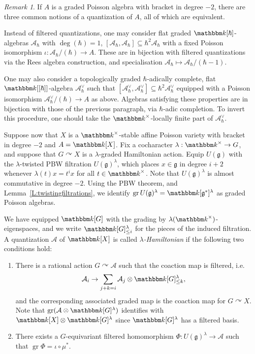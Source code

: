 \documentclass[twoside,12pt,reqno]{amsart}
\theoremstyle{remark}
\newtheorem{Remark}[Theorem]{Remark}
\numberwithin{equation}{section}
\def\k{{\mathbbm k}}
\def\gr{\operatorname{gr}}
\def\g{{\mathfrak g}}
\newcommand{\A}{\mathcal{A}}
\begin{document}
\begin{Remark}
\label{R:differentquantizations}
If $A$ is a graded Poisson algebra with bracket in degree $-2$, there are three common notions of a quantization of $A$, all of which are equivalent.

Instead of filtered quantizations, one may consider flat graded $\k[\hbar]$-algebras $\A_\hbar$ with $\deg(\hbar) = 1$, $[\A_\hbar, \A_\hbar] \subseteq \hbar^2 \A_\hbar$ with a fixed Poisson isomorphism $\iota : \A_\hbar / (\hbar) \to A$. These are in bijection with filtered quantizations via the Rees algebra construction, and specialisation $\A_\hbar \mapsto \A_\hbar / (\hbar - 1)$.

One may also consider a topologically graded $\hbar$-adically complete, flat $\k[[\hbar]]$-algebra $\A_\hbar^\vee$ such that $[\A_\hbar^\vee, \A_\hbar^\vee] \subseteq \hbar^2 \A_\hbar^\vee$ equipped with a Poisson isomorphism $\A_\hbar^\vee / (\hbar) \to A$ as above. Algebras satisfying these properties are in bijection with those of the previous paragraph, via $\hbar$-adic completion. To invert this procedure, one should take the $\k^\times$-locally finite part of $\A_\hbar^\vee$.
\end{Remark}

Suppose now that $X$ is a $\k^\times$-stable affine Poisson variety with bracket in degree $-2$ and $A = \k[X]$. Fix a cocharacter $\lambda : \k^\times \to G$, and suppose that $G \curvearrowright X$ is a $\lambda$-graded Hamiltonian action. Equip $U(\g)$ with the $\lambda$-twisted PBW filtration $U(\g)^\lambda$, which places $x\in \g$ in degree $i + 2$ whenever $\lambda(t) x = t^i x$ for all $t \in \k^\times$. Note that $U(\g)^\lambda$ is almost commutative in degree $-2$. Using the PBW theorem, and Lemma~\ref{L:twistingfiltrations}, we identify $\gr U(\g)^\lambda = \k[\g^*]^\lambda$ as graded Poisson algebras.

We have equipped $\k[G]$ with the grading by $\lambda(\k^\times)$-eigenspaces, and we write $\k[G]_{\le i}^\lambda$ for the pieces of the induced filtration. A quantization $\A$ of $\k[X]$ is called {\it $\lambda$-Hamiltonian} if the following two conditions hold:\vspace{4pt}
\begin{enumerate}
\setlength{\itemsep}{4pt}
\item[(Q1)]  There is a rational action $G\curvearrowright \A$ such that the coaction map is filtered, i.e. 
$$\A_i \to \sum_{j+k = i} \A_j \otimes \k[G]_{\le k}^\lambda,$$
and the corresponding associated graded map is the coaction map for $G \curvearrowright X$. Note that $\gr (\A \otimes \k[G]^\lambda)$ identifies with $\k[X] \otimes \k[G]^\lambda$ since $\k[G]^\lambda$ has a filtered basis.
\item[(Q2)] There exists a $G$-equivariant filtered homomorphism $\Phi : U(\g)^\lambda \to \A$  such that $\gr \Phi = \iota \circ \mu^*$.\vspace{4pt}
\end{enumerate}
\end{document}
